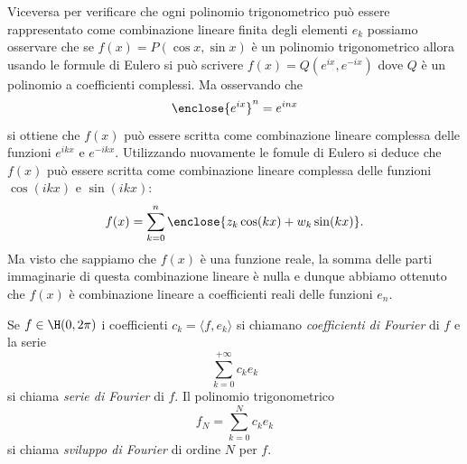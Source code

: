 Viceversa per verificare che ogni polinomio trigonometrico può essere rappresentato
come combinazione lineare finita degli elementi $e_k$
possiamo osservare che se $f(x) = P(\cos x,\sin x)$ è un polinomio trigonometrico
allora usando le formule di Eulero si può scrivere $f(x) = Q(e^{ix}, e^{-ix})$
dove $Q$ è un polinomio a coefficienti complessi. Ma osservando che
\[
  \enclose{e^{ix}}^n = e^{inx}
\]
si ottiene che $f(x)$ può essere scritta come combinazione lineare complessa
delle funzioni $e^{ikx}$ e $e^{-ikx}$. Utilizzando nuovamente le fomule di
Eulero si deduce che $f(x)$ può essere scritta come combinazione lineare
complessa delle funzioni $\cos(ikx)$ e $\sin(ikx)$:
\[
  f(x) = \sum_{k=0}^n \enclose{z_k \cos(kx) + w_k \sin(kx)}.
\]
Ma visto che sappiamo che $f(x)$ è una funzione reale, la somma delle parti
immaginarie di questa combinazione lineare è nulla e dunque abbiamo ottenuto
che $f(x)$ è combinazione lineare a coefficienti reali
delle funzioni $e_n$.

\begin{definition}
Se $f\in \H(0,2\pi)$ i coefficienti $c_k = \langle f, e_k\rangle$
si chiamano \emph{coefficienti di Fourier}%
 di $f$
e la serie
\[
  \sum_{k=0}^{+\infty} c_k e_k
\]
si chiama \emph{serie di Fourier}%
 di $f$.
Il polinomio trigonometrico
\[
  f_N = \sum_{k=0}^{N} c_k e_k
\]
si chiama \emph{sviluppo di Fourier}%
 di ordine $N$ per $f$.
\end{definition}

